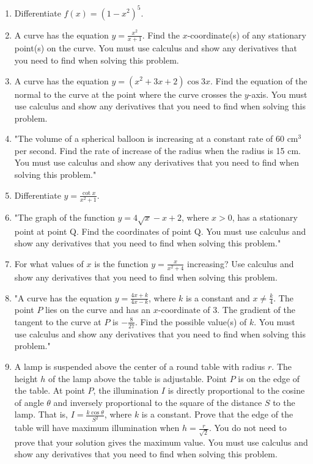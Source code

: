 \documentclass{article}
\begin{document}
\begin{enumerate}
\vspace{3cm}
\item Differentiate \( f(x) = (1 - x^2)^5 \).
\vspace{3cm}
\item A curve has the equation \( y = \frac{x^2}{x+1} \). Find the \( x \)-coordinate(s) of any stationary point(s) on the curve. You must use calculus and show any derivatives that you need to find when solving this problem.
\vspace{3cm}
\item A curve has the equation \( y = (x^2 + 3x + 2) \cos 3x \). Find the equation of the normal to the curve at the point where the curve crosses the \( y \)-axis. You must use calculus and show any derivatives that you need to find when solving this problem.
\vspace{3cm}
\item "The volume of a spherical balloon is increasing at a constant rate of 60 cm\(^3\) per second. Find the rate of increase of the radius when the radius is 15 cm. You must use calculus and show any derivatives that you need to find when solving this problem."
\vspace{3cm}
\item Differentiate \( y = \frac{\cot x}{x^2 + 1} \).
\vspace{3cm}
\item "The graph of the function \( y = 4\sqrt{x} - x + 2 \), where \( x > 0 \), has a stationary point at point Q. Find the coordinates of point Q. You must use calculus and show any derivatives that you need to find when solving this problem."
\vspace{3cm}
\item For what values of \( x \) is the function \( y = \frac{x}{x^2 + 4} \) increasing? Use calculus and show any derivatives that you need to find when solving this problem.
\vspace{3cm}
\item "A curve has the equation \( y = \frac{4x + k}{4x - k} \), where \( k \) is a constant and \( x \neq \frac{k}{4} \). The point \( P \) lies on the curve and has an \( x \)-coordinate of 3. The gradient of the tangent to the curve at \( P \) is \(-\frac{8}{27}\). Find the possible value(s) of \( k \). You must use calculus and show any derivatives that you need to find when solving this problem."
\vspace{3cm}
\item A lamp is suspended above the center of a round table with radius \( r \). The height \( h \) of the lamp above the table is adjustable. Point \( P \) is on the edge of the table. At point \( P \), the illumination \( I \) is directly proportional to the cosine of angle \( \theta \) and inversely proportional to the square of the distance \( S \) to the lamp. That is, \( I = \frac{k \cos \theta}{S^2} \), where \( k \) is a constant. Prove that the edge of the table will have maximum illumination when \( h = \frac{r}{\sqrt{2}} \). You do not need to prove that your solution gives the maximum value. You must use calculus and show any derivatives that you need to find when solving this problem.

\end{enumerate}
\end{document}
